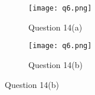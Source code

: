 \begin{enumerate}
\end{enumerate}

\begin{figure}[!htb]
\centering
\begin{subfigure}[b]{\textwidth}
\centering
\texttt{[image: q6.png]}
\caption{Question 14(a)}
\end{subfigure}
\begin{subfigure}[b]{\textwidth}
\centering
\texttt{[image: q6.png]}
\caption{Question 14(b)}
\end{subfigure}
\end{figure}